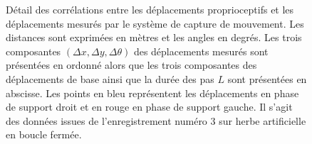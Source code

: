 \begin{figure}[htbp]
\begin{subfigure}{0.22\paperwidth}
    \end{subfigure}
    \caption{\label{fig:odometry_lwpr_function_read} 
        Détail des corrélations entre les déplacements proprioceptifs et les déplacements
        mesurés par le système de capture de mouvement.
        Les distances sont exprimées en mètres et les angles en degrés.
        Les trois composantes $(\Delta x, \Delta y, \Delta \theta)$ des déplacements mesurés sont présentées en ordonné
        alors que les trois composantes des déplacements de base ainsi que la durée des pas $L$ sont présentées en abscisse.
        Les points en bleu représentent les déplacements en phase de support droit et en rouge en phase de support gauche.
        Il s'agit des données issues de l'enregistrement numéro $3$ sur herbe artificielle en boucle fermée.
    }
\end{figure}

